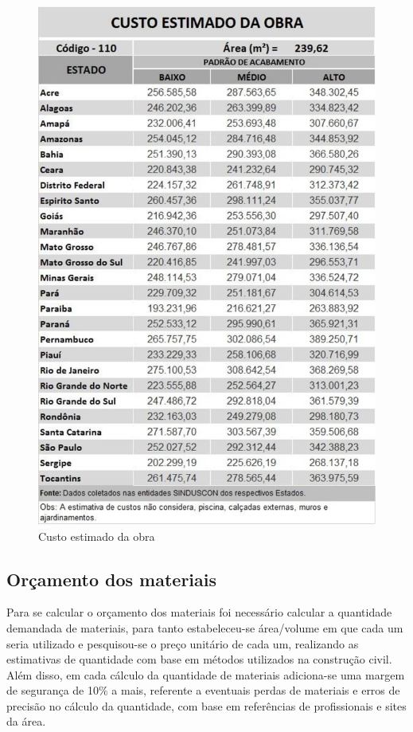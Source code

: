 \begin{figure}[H]
  \begin{center}
	\includegraphics[keepaspectratio,scale=1,angle=0]{figuras/custo_da_obra.eps}
	\caption{Custo estimado da obra}
  \end{center}
\end{figure}

\subsection*{\textbf{Orçamento dos materiais}}

	Para se calcular o orçamento dos materiais foi necessário calcular a quantidade demandada de materiais, para tanto estabeleceu-se área/volume em que cada um seria utilizado e pesquisou-se o preço unitário de cada um, realizando as estimativas de quantidade com base em métodos utilizados na construção civil. Além disso, em cada cálculo da quantidade de materiais adiciona-se uma margem de segurança de 10\% a mais, referente a eventuais perdas de materiais e erros de precisão no cálculo da quantidade, com base em referências de profissionais e sites da área.

